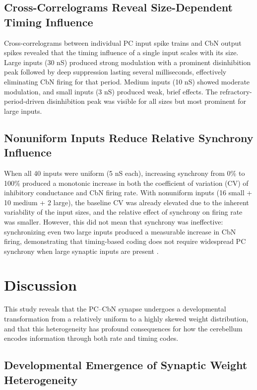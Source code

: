 \documentclass[12pt]{article}
\begin{document}
\subsection{Cross-Correlograms Reveal Size-Dependent Timing Influence}

Cross-correlograms between individual PC input spike trains and CbN output spikes revealed that the timing influence of a single input scales with its size. Large inputs (30 nS) produced strong modulation with a prominent disinhibition peak followed by deep suppression lasting several milliseconds, effectively eliminating CbN firing for that period. Medium inputs (10 nS) showed moderate modulation, and small inputs (3 nS) produced weak, brief effects. The refractory-period-driven disinhibition peak was visible for all sizes but most prominent for large inputs.

\subsection{Nonuniform Inputs Reduce Relative Synchrony Influence}

When all 40 inputs were uniform (5 nS each), increasing synchrony from 0\% to 100\% produced a monotonic increase in both the coefficient of variation (CV) of inhibitory conductance and CbN firing rate. With nonuniform inputs (16 small + 10 medium + 2 large), the baseline CV was already elevated due to the inherent variability of the input sizes, and the relative effect of synchrony on firing rate was smaller. However, this did not mean that synchrony was ineffective: synchronizing even two large inputs produced a measurable increase in CbN firing, demonstrating that timing-based coding does not require widespread PC synchrony when large synaptic inputs are present \citep{shin2007dynamic}.

\section{Discussion}

This study reveals that the PC--CbN synapse undergoes a developmental transformation from a relatively uniform to a highly skewed weight distribution, and that this heterogeneity has profound consequences for how the cerebellum encodes information through both rate and timing codes.

\subsection{Developmental Emergence of Synaptic Weight Heterogeneity}
\end{document}
